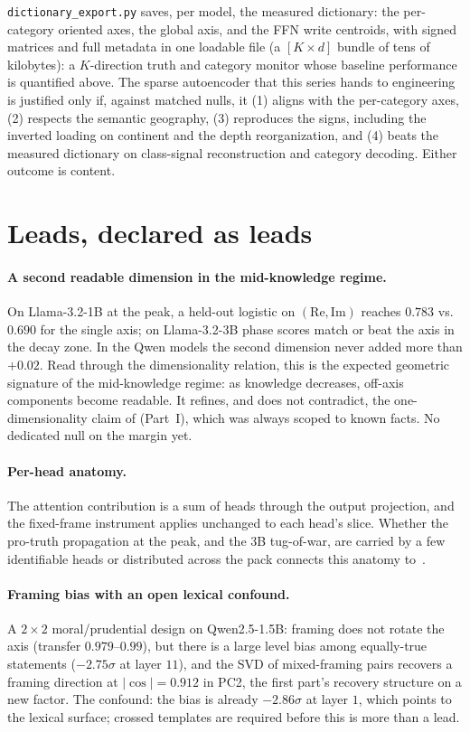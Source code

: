 \documentclass[11pt]{article}
\begin{document}
\texttt{dictionary\_export.py} saves, per model, the measured dictionary:
the per-category oriented axes, the global axis, and the FFN write
centroids, with signed matrices and full metadata in one loadable file (a
$[K \times d]$ bundle of tens of kilobytes): a $K$-direction truth and
category monitor whose baseline performance is quantified above. The
sparse autoencoder that this series hands to engineering is justified only
if, against matched nulls, it (1) aligns with the per-category axes, (2)
respects the semantic geography, (3) reproduces the signs, including the
inverted loading on continent and the depth reorganization, and (4) beats
the measured dictionary on class-signal reconstruction and category
decoding. Either outcome is content.

\section{Leads, declared as leads}
\label{b:sec:leads}

\paragraph{A second readable dimension in the mid-knowledge regime.} On
Llama-3.2-1B at the peak, a held-out logistic on $(\mathrm{Re},
\mathrm{Im})$ reaches $0.783$ vs.\ $0.690$ for the single axis; on
Llama-3.2-3B phase scores match or beat the axis in the decay zone. In the
Qwen models the second dimension never added more than $+0.02$. Read
through the dimensionality relation, this is the expected geometric
signature of the mid-knowledge regime: as knowledge decreases, off-axis
components become readable. It refines, and does not contradict, the
one-dimensionality claim of (Part~I), which was always scoped to
known facts. No dedicated null on the margin yet.

\paragraph{Per-head anatomy.} The attention contribution is a sum of heads
through the output projection, and the fixed-frame instrument applies
unchanged to each head's slice. Whether the pro-truth propagation at the
peak, and the 3B tug-of-war, are carried by a few identifiable heads or
distributed across the pack connects this anatomy
to~\cite{headgenome}.

\paragraph{Framing bias with an open lexical confound.} A $2{\times}2$
moral/prudential design on Qwen2.5-1.5B: framing does not rotate the axis
(transfer $0.979$--$0.99$), but there is a large level bias among
equally-true statements ($-2.75\sigma$ at layer $11$), and the SVD of
mixed-framing pairs recovers a framing direction at $|\cos| = 0.912$ in
PC2, the first part's recovery structure on a new factor. The
confound: the bias is already $-2.86\sigma$ at layer $1$, which points to
the lexical surface; crossed templates are required before this is more
than a lead.
\end{document}
